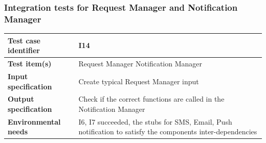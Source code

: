 \documentclass[a4paper,11pt]{report} %
\begin{document}
		\subsubsection{Integration tests for Request Manager and Notification Manager} \label{sec:3.1.11}
			\begin{minipage}{\linewidth}
			\end{minipage}		
		\begin{center}
			\renewcommand{\arraystretch}{1.2}
			\setlength{\tabcolsep}{24pt}
			\begin{tabular}{ l  p{9cm}}\hline
				\textbf{Test case identifier} & I14\\\hline
				\textbf{Test item(s)} & Request Manager \textrightarrow Notification Manager\\\hline
				\textbf{Input specification} & Create typical Request Manager input \\\hline
				\textbf{Output specification} & Check if the correct functions are called in the Notification Manager\\\hline
				\textbf{Environmental needs} &  I6, I7 succeeded, the stubs for SMS, Email, Push notification to satisfy the components inter-dependencies\\\hline
			\end{tabular}
		\end{center}	
		
\end{document}
